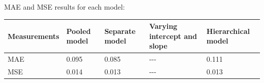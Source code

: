 \documentclass[11pt]{article}
\begin{document}
MAE and MSE results for each model:

\begin{longtable}[]{@{}lllll@{}}
\toprule
\begin{minipage}[b]{0.05\columnwidth}\raggedright\strut
Measurements\strut
\end{minipage} & \begin{minipage}[b]{0.05\columnwidth}\raggedright\strut
Pooled model\strut
\end{minipage} & \begin{minipage}[b]{0.05\columnwidth}\raggedright\strut
Separate model\strut
\end{minipage} & \begin{minipage}[b]{0.05\columnwidth}\raggedright\strut
Varying intercept and slope\strut
\end{minipage} & \begin{minipage}[b]{0.05\columnwidth}\raggedright\strut
Hierarchical model\strut
\end{minipage}\tabularnewline
\midrule
\endhead
\begin{minipage}[t]{0.05\columnwidth}\raggedright\strut
MAE\strut
\end{minipage} & \begin{minipage}[t]{0.05\columnwidth}\raggedright\strut
0.095\strut
\end{minipage} & \begin{minipage}[t]{0.05\columnwidth}\raggedright\strut
0.085\strut
\end{minipage} & \begin{minipage}[t]{0.05\columnwidth}\raggedright\strut
-\/-\/-\strut
\end{minipage} & \begin{minipage}[t]{0.05\columnwidth}\raggedright\strut
0.111\strut
\end{minipage}\tabularnewline
\begin{minipage}[t]{0.05\columnwidth}\raggedright\strut
MSE\strut
\end{minipage} & \begin{minipage}[t]{0.05\columnwidth}\raggedright\strut
0.014\strut
\end{minipage} & \begin{minipage}[t]{0.05\columnwidth}\raggedright\strut
0.013\strut
\end{minipage} & \begin{minipage}[t]{0.05\columnwidth}\raggedright\strut
-\/-\/-\strut
\end{minipage} & \begin{minipage}[t]{0.05\columnwidth}\raggedright\strut
0.013\strut
\end{minipage}\tabularnewline
\bottomrule
\end{longtable}
\end{document}
